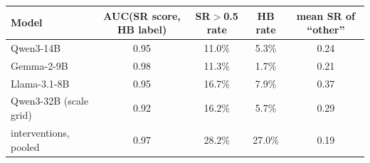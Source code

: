 \begin{tabular}{lcccc}
\toprule
Model & AUC(SR score, HB label) & SR$>$0.5 rate & HB rate & mean SR of ``other'' \\
\midrule
Qwen3-14B & 0.95 & 11.0\% & 5.3\% & 0.24 \\
Gemma-2-9B & 0.98 & 11.3\% & 1.7\% & 0.21 \\
Llama-3.1-8B & 0.95 & 16.7\% & 7.9\% & 0.37 \\
Qwen3-32B (scale grid) & 0.92 & 16.2\% & 5.7\% & 0.29 \\
interventions, pooled & 0.97 & 28.2\% & 27.0\% & 0.19 \\
\bottomrule
\end{tabular}